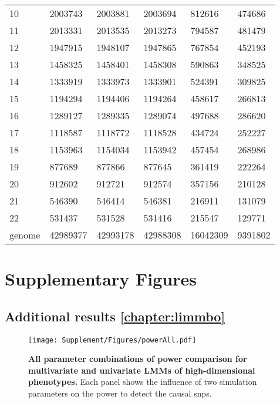 \begin{table}[htbp]
\begin{tabular}{llllll}
    \num{10} & \num{2003743} & \num{2003881} & \num{2003694} & \num{812616} & \num{474686} \\
    \num{11} & \num{2013331} & \num{2013535} & \num{2013273} & \num{794587} & \num{481479} \\
    \num{12} & \num{1947915} & \num{1948107} & \num{1947865} & \num{767854} & \num{452193} \\
    \num{13} & \num{1458325} & \num{1458401} & \num{1458308} & \num{590863} & \num{348525} \\
    \num{14} & \num{1333919} & \num{1333973} & \num{1333901} & \num{524391} & \num{309825} \\
    \num{15} & \num{1194294} & \num{1194406} & \num{1194264} & \num{458617} & \num{266813} \\
    \num{16} & \num{1289127} & \num{1289335} & \num{1289074} & \num{497688} & \num{286620} \\
    \num{17} & \num{1118587} & \num{1118772} & \num{1118528} & \num{434724} & \num{252227} \\
    \num{18} & \num{1153963} & \num{1154034} & \num{1153942} & \num{457454} & \num{268986} \\
    \num{19} & \num{877689} & \num{877866} & \num{877645} & \num{361419} & \num{222264} \\
    \num{20} & \num{912602} & \num{912721} & \num{912574} & \num{357156} & \num{210128} \\
    \num{21} & \num{546390} & \num{546414} & \num{546381} & \num{216911} & \num{131079} \\
    \num{22} & \num{531437} & \num{531528} & \num{531416} & \num{215547} & \num{129771} \\
    \midrule
    genome & \num{42989377} & \num{42993178} & \num{42988308} & \num{16042309} & \num{9391802} \\
    \bottomrule
    \end{tabular}%
  \label{tab:imputationQC}%
\end{table}%


\chapter{Supplementary Figures}
\newpage
\section{Additional results \cref{chapter:limmbo}}
\begin{figure}[hbtp]
	\centering
	\texttt{[image: Supplement/Figures/powerAll.pdf]}
		\caption[\textbf{All parameter combinations of power comparison for multivariate and univariate LMMs of high-dimensional phenotypes.}]{\textbf{All parameter combinations of power comparison for multivariate and univariate LMMs of high-dimensional phenotypes.} Each panel shows the influence of two simulation parameters on the power to detect the causal \glspl{snp}.} 
	 	\label{fig:power-all}
\end{figure}

